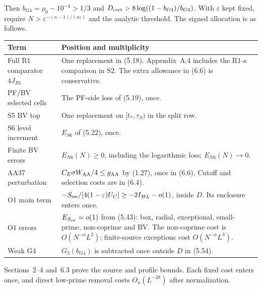Then $b_{G4}=\rho_0-10^{-4}>1/3$ and
$D_{\rm cert}>8\log((1-b_{G4})/b_{G4})$.
With $\varepsilon$ kept fixed, require $N>\varepsilon^{-(a-1)/(a\varepsilon)}$
and the analytic threshold.
The signed allocation is as follows.
\begin{longtable}{@{}p{}p{}@{}}
\toprule
Term & Position and multiplicity \\
\midrule
Full R1 comparator $4J_{R1}$ & One replacement in (5.18). Appendix~A.4 includes the R1-$\kappa$ comparison in S2. The extra allowance in (6.6) is conservative. \\
PF/BV selected cells & The PF-side loss of (5.19), once. \\
S5 BV top & One replacement on $[t_*,\tau_S)$ in the split row. \\
S6 level increment & $E_{S6}$ of (5.22), once. \\
Finite BV errors & $E_{N6}(N)\ge0$, including the logarithmic loss; $E_{N6}(N)\to0$. \\
AA37 perturbation & $C_E\sigma W_{\rm AA}/4\le g_{\rm AA}$ by (1.27), once in (6.6). Cutoff and selection costs are in (6.4). \\
O1 main term & $-S_{\rm sw}/[4(1-\varepsilon)U_C]\ge-2I_{HL}-o(1)$, inside $D$. Its enclosure enters once. \\
O1 errors & $E_{S_{\rm sw}}=o(1)$ from (5.43): box, radial, exceptional, small-prime, non-coprime and BV. The non-coprime cost is $O(N^{-\alpha}L^2)$; finite-source exceptions cost $O(N^{-\alpha}L^3)$. \\
Weak G4 & $G_3(b_{G4})$ is subtracted once outside $D$ in (5.54). \\
\bottomrule
\end{longtable}

Sections~2--4 and~6.3 prove the source and profile bounds.
Each fixed cost enters once,
and direct low-prime removal costs $O_u(L^{-28})$ after normalization.
